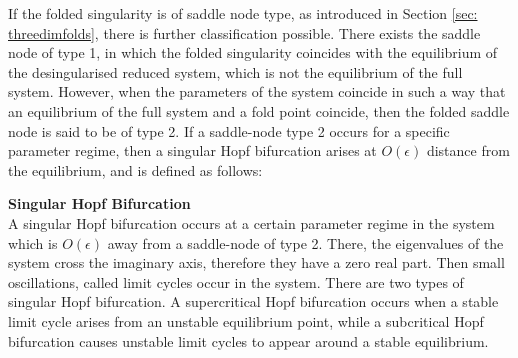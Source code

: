 If the folded singularity is of saddle node type, as introduced in Section \ref{sec: threedimfolds}, there is further classification possible.
There exists the saddle node of type 1, in which the folded singularity coincides with the equilibrium of the desingularised reduced system, which is not the equilibrium of the full system. However, when the parameters of the system coincide in such a way that an equilibrium of the full system and a fold point coincide, then the folded saddle node is said to be of type 2. If a saddle-node type 2 occurs for a specific parameter regime, then a singular Hopf bifurcation arises at $O(\epsilon)$ distance from the equilibrium, and is defined as follows:
\begin{definition}{\textbf{Singular Hopf Bifurcation} \citealp{strogatz2007nonlinear}}\\
A singular Hopf bifurcation occurs at a certain parameter regime in the system which is $O(\epsilon)$ away from a saddle-node of type 2. There, the eigenvalues of the system cross the imaginary axis, therefore they have a zero real part. Then small oscillations, called limit cycles occur in the system. There are two types of singular Hopf bifurcation. A supercritical Hopf bifurcation occurs when a stable limit cycle arises from an unstable equilibrium point, while a subcritical Hopf bifurcation causes unstable limit cycles to appear around a stable equilibrium.
\end{definition}

